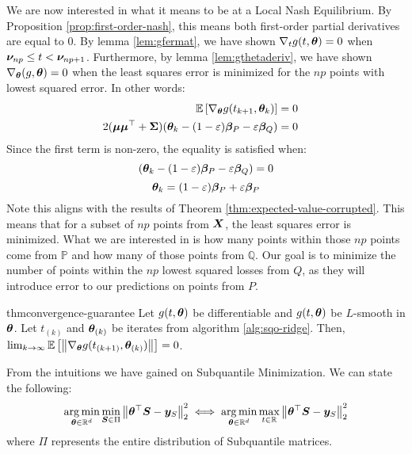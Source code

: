 \documentclass{article} %
\newenvironment{proofsketch}{%
	\renewcommand{\proofname}{Proof Sketch}\proof}{\endproof}
\newcommand{\norm}[1]{\left\lVert#1\right\rVert}
\begin{document}
	We are now interested in what it means to be at a Local Nash Equilibrium. By Proposition \ref{prop:first-order-nash}, this means both first-order partial derivatives are equal to $0$. By lemma \ref{lem:gfermat}, we have shown $\nabla_tg(t,{\bm{\theta}}) = 0$ when ${\bm{\nu}}_{np} \leq t < {\bm{\nu}}_{np+1}$. Furthermore, by lemma \ref{lem:gthetaderiv}, we have shown $\nabla_{\bm{\theta}}(g,{\bm{\theta}}) = 0$ when the least squares error is minimized for the $np$ points with lowest squared error. In other words:
	\begin{align*}
		\mathbb{E}\left[\nabla_{\bm{\theta}} g(t_{k+1},{\bm{\theta}}_k)\right] &= 0 &&\\
		2({\bm{\mu}}{\bm{\mu}}^\top + {\bm{\Sigma}})({\bm{\theta}}_k - (1-\varepsilon){\bm{\beta}}_P-\varepsilon{\bm{\beta}}_Q) &= 0&&
	\end{align*}
	Since the first term is non-zero, the equality is satisfied when:
	\begin{equation*}
		({\bm{\theta}}_k - (1-\varepsilon){\bm{\beta}}_P-\varepsilon{\bm{\beta}}_Q) = 0
	\end{equation*}	
	\begin{equation*}
		{\bm{\theta}}_k = (1-\varepsilon){\bm{\beta}}_P + \varepsilon{\bm{\beta}}_P 
	\end{equation*}
	Note this aligns with the results of Theorem \ref{thm:expected-value-corrupted}.
	This means that for a subset of $np$ points from ${\bm{X}}$, the least squares error is minimized. What we are interested in is how many points within those $np$ points come from $\mathbb{P}$ and how many of those points from $\mathbb{Q}$. Our goal is to minimize the number of points within the $np$ lowest squared losses from $Q$, as they will introduce error to our predictions on points from $P$. 
	
	
	
	\begin{restatable}{thm}{convergence-guarantee}
		\label{thm:convergence-guarantee}
		Let $g(t,{\bm{\theta}})$ be differentiable and $g(t,{\bm{\theta}})$ be $L$-smooth in ${\bm{\theta}}$. Let $t_{(k)}$ and ${\bm{\theta}}_{(k)}$ be iterates from algorithm \ref{alg:sqo-ridge}. Then, $\lim_{k \to \infty} \mathbb{E}\left[\norm{\nabla_\vtheta g(t_{(k+1)},\vtheta_{(k)})}\right] = 0$.
	\end{restatable}
	\begin{proofsketch}
		From the intuitions we have gained on Subquantile Minimization. We can state the following:
		\begin{equation}
			\argmin_{\vtheta \in \mathbb{R}^d}\min_{\mS \in \Pi}\norm{\vtheta^\top\mS - \vy_S}_2^2 \iff \argmin_{\vtheta \in \mathbb{R}^d}\max_{t \in \mathbb{R}}\norm{\vtheta^\top\mS - \vy_S}_2^2
		\end{equation}
		where $\Pi$ represents the entire distribution of Subquantile matrices. 
	\end{proofsketch}
	
\end{document}
